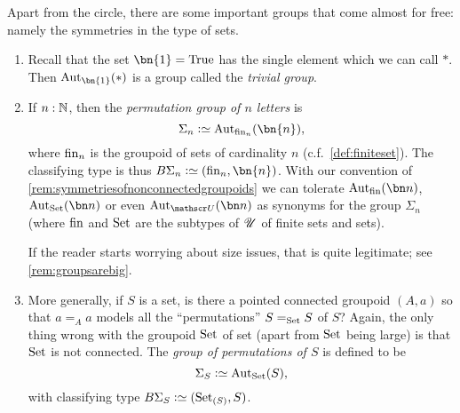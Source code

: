 \begin{example}\label{ex:groups}
  Apart from the circle, there are some important groups that come almost for free: namely the symmetries in the type of sets.
  \begin{enumerate}
  \item Recall that the set $\bn{1} =\true$ has the single element which we can call $*$. Then $\aut_{\bn{1} }(*)$ is a group called the \emph{trivial group}.
  \item If $n:\mathbb{N}$, then the \emph{permutation group of $n$ letters} is 
$$\Sigma_n\defequi\aut_{\fin_n}(\bn{n} ),$$ 
where $\fin_n$ is the groupoid of sets of cardinality $n$ (c.f.~\ref{def:finiteset}).  
The classifying type is thus $B\Sigma_n\defequi (\fin_n,\bn{n})$.
With our convention of \cref{rem:symmetriesofnonconnectedgroupoids} we can tolerate $\aut_{\fin}(\bn n)$, $\aut_{\Set}(\bn n)$ or even $\aut_{\UU}(\bn n)$ as synonyms for the group $\Sigma_n$ (where $\fin$ and $\mathrm{Set}$ are the subtypes of ${\mathscr{U}}$ of finite sets and sets).  

If the reader starts worrying about size issues, that is quite legitimate; see \cref{rem:groupsarebig}.
  \item More generally, if $S$ is a set, is there a pointed connected groupoid $(A,a)$ so that $a=_Aa$ models all the ``permutations'' $S=_{\mathrm{Set}}S$ of $S$?  Again, the only thing wrong with the groupoid $\mathrm{Set}$ of set (apart from $\mathrm{Set}$ being large) is that $\mathrm{Set}$ is not connected. 
%
 The \emph{group of permutations of $S$} is defined to be 
$$\Sigma_{S}\defequi\aut_{\Set}(S),$$  
with classifying type $B\Sigma_S\defequi(\conncomp \Set S,S)$.
  \end{enumerate}
\end{example}

